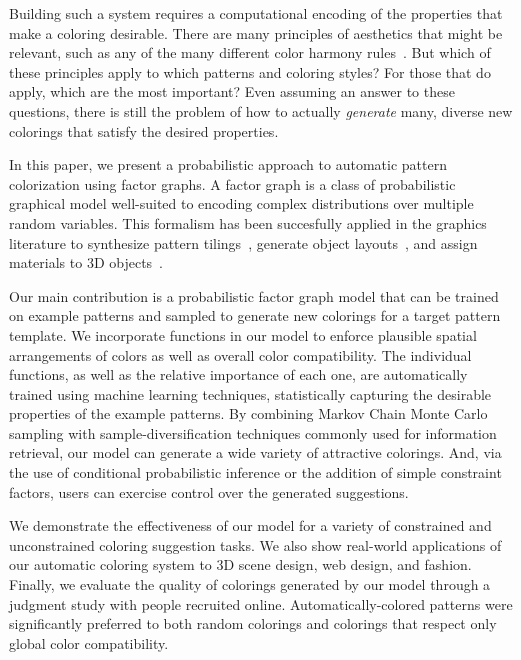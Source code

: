 Building such a system requires a computational encoding of the properties that make a coloring desirable. There are many principles of aesthetics that might be relevant, such as any of the many different color harmony rules~\cite{ColorHarmonyBook}. But which of these principles apply to which patterns and coloring styles? For those that do apply, which are the most important? Even assuming an answer to these questions, there is still the problem of how to actually \emph{generate} many, diverse new colorings that satisfy the desired properties.

In this paper, we present a probabilistic approach to automatic pattern colorization using factor graphs. A factor graph is a class of probabilistic graphical model well-suited to encoding complex distributions over multiple random variables. This formalism has been succesfully applied in the graphics literature to synthesize pattern tilings~\cite{YiTingTiledPatterns}, generate object layouts~\cite{YiTingLARJ}, and assign materials to 3D objects~\cite{MaterialMemex}.

Our main contribution is a probabilistic factor graph model that can be trained on example patterns and sampled to generate new colorings for a target pattern template. We incorporate functions in our model to enforce plausible spatial arrangements of colors as well as overall color compatibility. The individual functions, as well as the relative importance of each one, are automatically trained using machine learning techniques, statistically capturing the desirable properties of the example patterns. By combining Markov Chain Monte Carlo sampling with sample-diversification techniques commonly used for information retrieval, our model can generate a wide variety of attractive colorings. And, via the use of conditional probabilistic inference or the addition of simple constraint factors, users can exercise control over the generated suggestions.

We demonstrate the effectiveness of our model for a variety of constrained and unconstrained coloring suggestion tasks. We also show real-world applications of our automatic coloring system to 3D scene design, web design, and fashion. Finally, we evaluate the quality of colorings generated by our model through a judgment study with people recruited online. Automatically-colored patterns were significantly preferred to both random colorings and colorings that respect only global color compatibility.